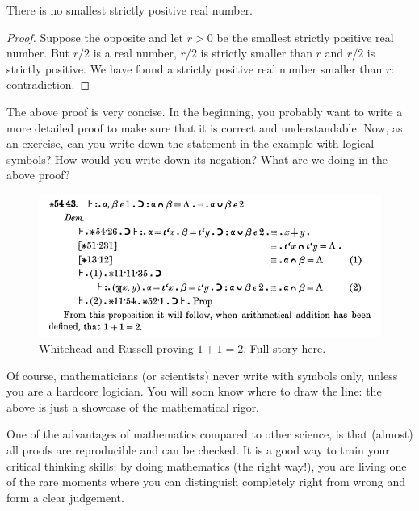 \documentclass[
	fontsize=10pt, %
	twoside=true, %
	secnumdepth=1, %
	numbers=noenddot, %
]{kaobook}
\begin{document}
\begin{example}
There is no smallest strictly positive real number.
\begin{proof}
Suppose the opposite and let $r>0$ be the smallest strictly positive real number. But $r/2$ is a real number, $r/2$ is strictly smaller than $r$ and $r/2$ is strictly positive. We have found a strictly positive real number smaller than $r$: contradiction.
\end{proof}
\end{example}

The above proof is very concise. In the beginning, you probably want to write a more detailed proof to make sure that it is correct and understandable. Now, as an exercise, can you write down the statement in the example with logical symbols? How would you write down its negation? What are we doing in the above proof?

\begin{figure}[h]
  \includegraphics{Principia_Mathematica.png}
  \caption{Whitehead and Russell proving $1+1=2$. Full story \href{https://en.wikipedia.org/wiki/Principia_Mathematica}{here}.}
  \label{fig:PrincipiaMathematica}
\end{figure}

\begin{remark}
Of course, mathematicians (or scientists) never write with symbols only, unless you are a hardcore logician. You will soon know where to draw the line: the above is just a showcase of the mathematical rigor.
\end{remark}

One of the advantages of mathematics compared to other science, is that (almost) all proofs are reproducible and can be checked. It is a good way to train your critical thinking skills: by doing mathematics (the right way!), you are living one of the rare moments where you can distinguish completely right from wrong and form a clear judgement.
\end{document}
